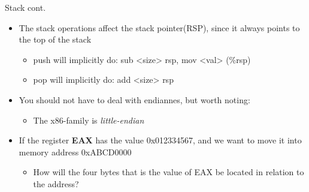 \documentclass[
	11pt, %
	aspectratio=169, %
]{beamer}
\begin{document}
\begin{frame}{Stack cont.}{\sectiontitle}
    \begin{itemize}
        \item The stack operations affect the stack pointer(RSP), since it always points to the top of the stack
              \begin{itemize}
                  \item push will implicitly do: sub <size> rsp, mov <val> (\%rsp)
                  \item pop will implicitly do: add <size> rsp
              \end{itemize}
        \item You should not have to deal with endiannes, but worth noting:
              \begin{itemize}
                  \item The x86-family is \textit{little-endian}
              \end{itemize}
        \item If the register \textbf{EAX} has the value 0x012334567, and we want to move it into memory address 0xABCD0000
              \begin{itemize}
                  \item How will the four bytes that is the value of EAX be located in relation to the address?
              \end{itemize}
    \end{itemize}
\end{frame}
\end{document}
